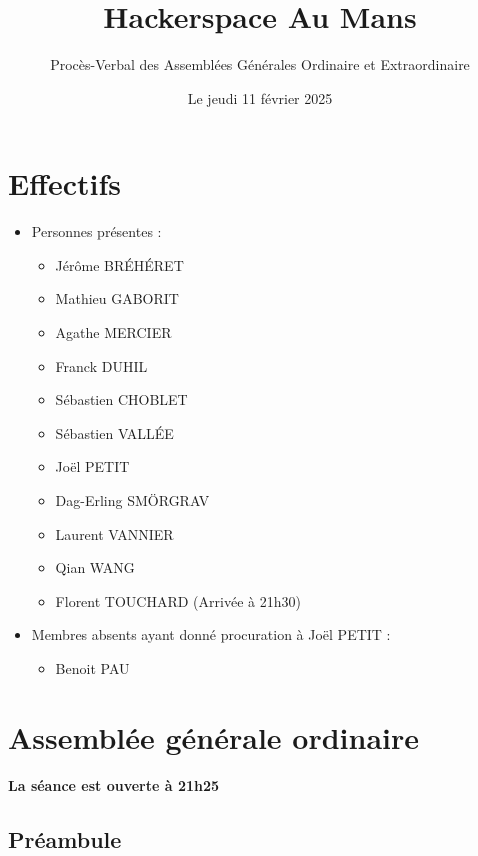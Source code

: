 \documentclass[a4paper, 11pt]{article}
\title{Hackerspace Au Mans}
\author{Procès-Verbal des Assemblées Générales Ordinaire et Extraordinaire}
\date{Le jeudi 11 février 2025}
\begin{document}
\maketitle

\section{Effectifs}

\begin{itemize}
	\item Personnes présentes : 
		\begin{itemize}
            \item Jérôme BRÉHÉRET
            \item Mathieu GABORIT
            \item Agathe MERCIER
            \item Franck DUHIL
            \item Sébastien CHOBLET
            \item Sébastien VALLÉE
            \item Joël PETIT
            \item Dag-Erling SMÖRGRAV
            \item Laurent VANNIER
            \item Qian WANG
            \item Florent TOUCHARD (Arrivée à 21h30)
		\end{itemize}
	\item Membres absents ayant donné procuration à Joël PETIT :
		\begin{itemize}
			\item Benoit PAU
		\end{itemize}
\end{itemize}

\bigskip


\section{Assemblée générale ordinaire}
\textbf{La séance est ouverte à 21h25}
\subsection*{Préambule}
\end{document}

